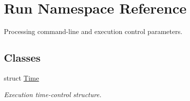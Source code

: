 \hypertarget{namespaceRun}{
\section{Run Namespace Reference}
\label{namespaceRun}
}
Processing command-line and execution control parameters.  


\subsection*{Classes}
\begin{CompactItemize}
\item 
struct \hyperlink{structRun_1_1Time}{Time}
\begin{CompactList}\small\item\em Execution time-control structure. \item\end{CompactList}\end{CompactItemize}
